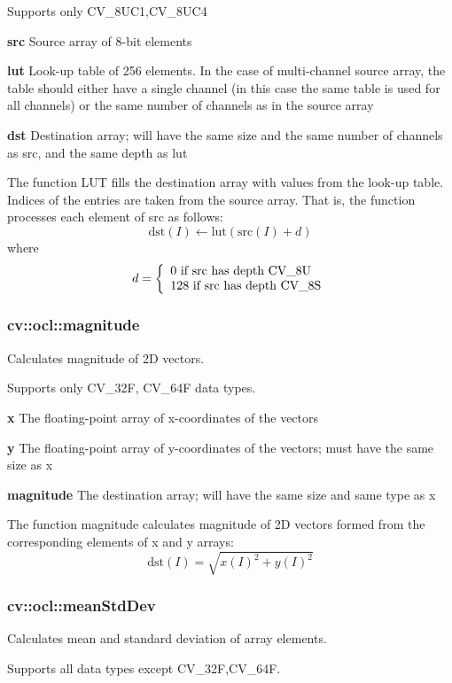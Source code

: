 \documentclass{article}
\begin{document}
Supports only CV{\_}8UC1,CV{\_}8UC4

\textbf{src }Source array of 8-bit elements

\textbf{lut }Look-up table of 256 elements. In the case of multi-channel
source array, the table should either have a single channel (in this case
the same table is used for all channels) or the same number of channels as
in the source array

\textbf{dst }Destination array; will have the same size and the same number
of channels as src, and the same depth as lut

The function LUT fills the destination array with values from the look-up
table. Indices of the entries are taken from the source array. That is, the
function processes each element of src as follows:
\[
\mbox{dst}(I)\leftarrow \mbox{lut}(\mbox{src}(I)+d)
\]
where
\[
d=\left\{ {{\begin{array}{*{20}c}
 {\mbox{0 if src has depth CV\_8U}} \hfill \\
 {\mbox{128 if src has depth CV\_8S}} \hfill \\
\end{array} }} \right.
\]
\newpage

\subsubsection{cv::ocl::magnitude}
\label{subsubsec:mylabel18}
Calculates magnitude of 2D vectors.

Supports only CV{\_}32F, CV{\_}64F data types.

\textbf{x }The floating-point array of x-coordinates of the vectors

\textbf{y }The floating-point array of y-coordinates of the vectors; must
have the same size as x

\textbf{magnitude }The destination array; will have the same size and same
type as x

The function magnitude calculates magnitude of 2D vectors formed from the
corresponding elements of x and y arrays:
\[
\mbox{dst}\left( I \right)=\sqrt {x\left( I \right)^2+y\left( I \right)^2}
\]
\newpage

\subsubsection{cv::ocl::meanStdDev}
\label{subsubsec:mylabel19}
Calculates mean and standard deviation of array elements.

Supports all data types except CV{\_}32F,CV{\_}64F.
\end{document}
